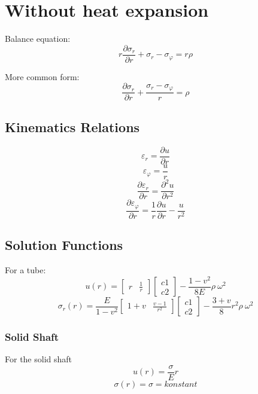 \documentclass[11pt]{article}
\begin{document}
\section{Without heat expansion}
Balance equation:
\begin{equation}
r \frac{\partial \sigma_r}{\partial r} + \sigma_r - \sigma_{\varphi} = r \rho
\end{equation}

More common form:
\begin{equation}
\frac{\partial \sigma_r}{\partial r} + \frac{\sigma_r - \sigma_{\varphi}}{r} = \rho
\end{equation}

\subsection{Kinematics Relations}
\begin{equation}
\varepsilon_r = \frac{\partial u}{\partial r}
\end{equation}
\begin{equation}
\varepsilon_{\varphi} = \frac{u}{r}
\end{equation}
\begin{equation}
\frac{\partial \varepsilon_r}{\partial r} = \frac{\partial^2 u}{\partial r^2}
\end{equation}
\begin{equation}
\frac{\partial \varepsilon_{\varphi}}{\partial r} = \frac{1}{r}\frac{\partial u}{\partial r} - \frac{u}{r^2}
\end{equation}

\subsection{Solution Functions}
For a tube:
\begin{equation}
u(r) = \left[\begin{array}{cc}
r  & \frac{1}{r} 
\end{array} \right] 
\left[ \begin{array}{c}
c1 \\ c2
\end{array}\right] - \frac{1-v^2}{8E}\rho\ \omega^2
\end{equation}
\begin{equation}
\sigma_r(r) = \frac{E}{1-v^2}
\left[\begin{array}{cc}
1+v  & \frac{v-1}{r^2} 
\end{array} \right]
\left[ \begin{array}{c}
c1 \\ c2
\end{array}\right] - 
\frac{3+v}{8} r^2 \rho \ \omega^2
\end{equation}

\subsubsection{Solid Shaft}
For the solid shaft
\begin{equation}
u(r) = \frac{\sigma}{E} r
\end{equation}
\begin{equation}
\sigma(r) = \sigma = konstant
\end{equation}
\end{document}
